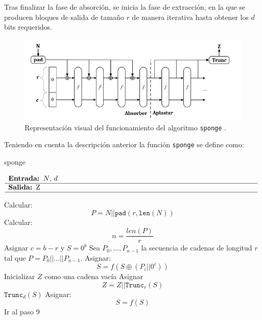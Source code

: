 Tras finalizar la fase de absorción, se inicia la fase de extracción, en la que se producen bloques de salida de tamaño \(r\) de manera iterativa hasta obtener los \(d\) bits requeridos.
\newpage
\begin{figure}[H]
	\centering
	\includegraphics[width=1\linewidth]{figuras/esponja}
	\caption{Representación visual del funcionamiento del algoritmo \texttt{sponge} \cite{FIPS202}.}
	\label{fig:esponja}
\end{figure}


Teniendo en cuenta la descripción anterior la función \texttt{sponge} se define como:
\begin{algorithm}[H]
	\caption{sponge}
	$\begin{array}{p{\textwidth}}
		\textbf{Entrada: }\(N\), \(d\) \\ 
		\hline
		\textbf{Salida: }Z\\ 
		\hline
	\end{array}$
	\begin{algorithmic}[1]
		\State Calcular:
		\begin{equation}
			P=N||\texttt{pad}(r,\texttt{len}(N))
		\end{equation}
		\State Calcular:
		\begin{equation}
			n=\dfrac{len(P)}{r}
		\end{equation}
		\State Asignar \(c=b-r\) y \(S=0^b\)
		\State Sea \(P_0,\hdots , P_{n-1}\) la secuencia de cadenas de longitud \(r\) tal que \(P=P_0||\hdots ||P_{n-1}\).
		\State Asignar:
		\begin{equation}
			S=f(S\oplus (P_i||0^c))
		\end{equation}
		\EndFor
		\State Inicializar \(Z\) como una cadena vacía
		\State Asignar 
		\begin{equation}
			Z=Z||\texttt{Trunc}_r(S)
		\end{equation}
		\State \Return \(\texttt{Trunc}_d(S)\)
		\EndIf
		\State Asignar: 
		\begin{equation}
			S=f(S)
		\end{equation}
		\State Ir al paso 9		
	\end{algorithmic}
\end{algorithm}

